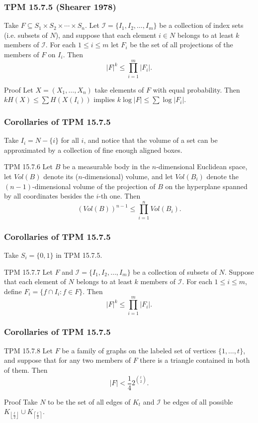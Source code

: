 \documentclass{beamer}
\newcommand{\lf}{\left\lfloor}
\newcommand{\rf}{\right\rfloor}
\newcommand{\lc}{\left\lceil}
\newcommand{\rc}{\right\rceil}
\begin{document}
\begin{frame}
  \frametitle{TPM 15.7.5 (Shearer 1978)}
  Take $F \subseteq S_1 \times S_2 \times \dotsb \times S_n$. Let $\mathcal{I} = \{ I_1, I_2, \dotsc, I_m \}$ be a collection of index sets (i.e. subsets of $N$), and suppose that each element $i \in N$ belongs to at least $k$ members of $\mathcal{I}$. For each $1 \le i \le m$ let $F_i$ be the set of all projections of the members of $F$ on $I_i$. Then \[ |F|^k \le \prod_{i = 1}^m |F_i|. \] \pause

  \begin{block}{Proof}
    Let $X = (X_1, \dotsc, X_n)$ take elements of $F$ with equal probability. Then $kH(X) \le \sum H(X(I_i))$ implies $k \log |F| \le \sum \log |F_i|$.
  \end{block}
\end{frame}

\begin{frame}
  \frametitle{Corollaries of TPM 15.7.5}
  Take $I_i = N - \{ i \}$ for all $i$, and notice that the volume of a set can be approximated by a collection of fine enough aligned boxes.
  \begin{block}{TPM 15.7.6}
    Let $B$ be a measurable body in the $n$-dimensional Euclidean space, let $Vol(B)$ denote its ($n$-dimensional) volume, and let $Vol(B_i)$ denote the $(n - 1)$-dimensional volume of the projection of $B$ on the hyperplane spanned by all coordinates besides the $i$-th one. Then \[ (Vol(B))^{n - 1} \le \prod_{i = 1}^n Vol(B_i). \]
  \end{block}
\end{frame}

\begin{frame}
  \frametitle{Corollaries of TPM 15.7.5}
  Take $S_i = \{ 0, 1 \}$ in TPM 15.7.5.
  \begin{block}{TPM 15.7.7}
    Let $F$ and $\mathcal{I} = \{ I_1, I_2, \dotsc, I_m \}$ be a collection of subsets of $N$. Suppose that each element of $N$ belongs to at least $k$ members of $\mathcal{I}$. For each $1 \le i \le m$, define $F_i = \{ f \cap I_i : f \in F \}.$ Then \[ |F|^k \le \prod_{i = 1}^m |F_i|. \]
  \end{block}
\end{frame}

\begin{frame}
  \frametitle{Corollaries of TPM 15.7.5}
  \begin{block}{TPM 15.7.8}
    Let $F$ be a family of graphs on the labeled set of vertices $\{ 1, \dotsc, t \}$, and suppose that for any two members of $F$ there is a triangle contained in both of them. Then \[ |F| < \frac{1}{4} 2^{\binom{t}{2}}. \]
  \end{block} \pause

  \begin{block}{Proof}
    Take $N$ to be the set of all edges of $K_t$ and $\mathcal{I}$ be edges of all possible $K_{\lf \frac{t}{2} \rf} \cup K_{\lc \frac{t}{2} \rc}$.
  \end{block}
\end{frame}
\end{document}
